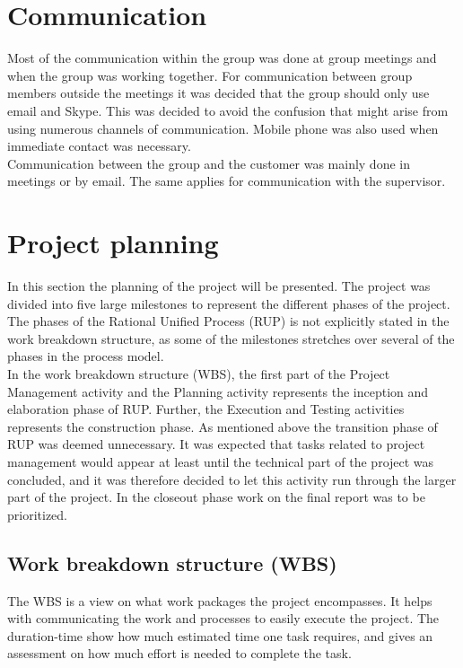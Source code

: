 \section{Communication}
Most of the communication within the group was done at group meetings and when the group was working together. For communication between group members outside the meetings it was decided that the group should only use email and Skype. This was decided to avoid the confusion that might arise from using numerous channels of communication. Mobile phone was also used when immediate contact was necessary.\\
\newline
Communication between the group and the customer was mainly done in meetings or by email. The same applies for communication with the supervisor.

\section{Project planning}

\label{projectplanning}

In this section the planning of the project will be presented. The project was divided into five large milestones to represent the different phases of the project. The phases of the Rational Unified Process (RUP) is not explicitly stated in the work breakdown structure, as some of the milestones stretches over several of the phases in the process model. \\
\newline
In the work breakdown structure (WBS), the first part of the Project Management activity and the Planning activity represents the inception and elaboration phase of RUP. Further, the Execution and Testing activities represents the construction phase. As mentioned above the transition phase of RUP was deemed unnecessary. It was expected that tasks related to project management would appear at least until the technical part of the project was concluded, and it was therefore decided to let this activity run through the larger part of the project. In the closeout phase work on the final report was to be prioritized.

\subsection{Work breakdown structure (WBS)}
The WBS is a view on what work packages the project encompasses. It helps with communicating the work and processes to easily execute the project. The duration-time show how much estimated time one task requires, and gives an assessment on how much effort is needed to complete the task.

